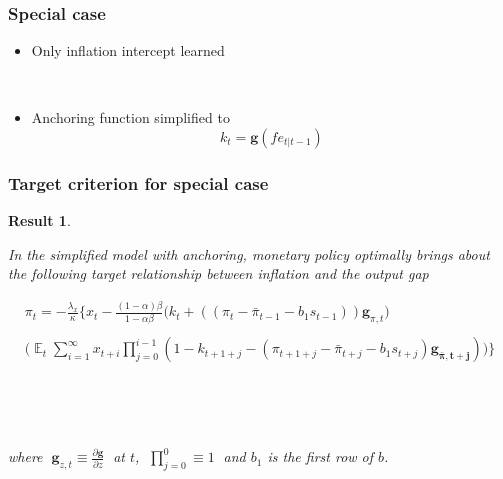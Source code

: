 \documentclass[11pt]{beamer}
\DeclareMathOperator{\E}{\mathbb{E}}
\newtheorem{result}{Result}
\begin{document}
\begin{frame}
	\frametitle{Special case}
	\label{special_case}

\begin{itemize}
\item Only inflation intercept learned

\

\item Anchoring function simplified to 
\begin{equation}
k_t = \mathbf{g}(fe_{t|t-1}) \label{gain_simple}
\end{equation}
\end{itemize}



\end{frame}

\begin{frame}
	\frametitle{Target criterion for special case}
	\label{anchTC}
	
	\begin{result} 

\

In the simplified model with anchoring, monetary policy optimally brings about the following target relationship between inflation and the output gap
	
\begin{align*}
\pi_t  = -\frac{\lambda_x}{\kappa}\bigg\{x_t - \frac{(1-\alpha)\beta}{1-\alpha\beta} \bigg(k_t+((\pi_t - \bar{\pi}_{t-1}-b_1 s_{t-1}))\mathbf{g}_{\pi,t}\bigg) \\
\\
\bigg(\E_t\sum_{i=1}^{\infty}x_{t+i}\prod_{j=0}^{i-1}(1-k_{t+1+j} - (\pi_{t+1+j} - \bar{\pi}_{t+j}-b_1 s_{t+j})\mathbf{g_{\bar{\pi}, t+j}}) \bigg)
\bigg\}  \label{target}
\end{align*}

\

\

where $\; \mathbf{g}_{z,t} \equiv \frac{\partial \mathbf{g}}{\partial z}\;$ at $t$, $\; \prod_{j=0}^{0} \equiv 1 \; $ and $b_1$ is the first row of $b$.
	\end{result}
\vfill 

\hfill \hyperlink{generalTC}{}

\end{frame}
\end{document}
